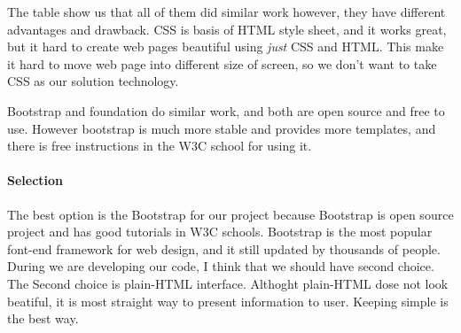 The table show us that all of them did similar work however, they have different advantages and drawback.
CSS is basis of HTML style sheet, and it works great, but it hard to create web pages beautiful using \textit{just} CSS and HTML.
This make it hard to move web page into different size of screen, so we don't want to take CSS as our solution technology.

Bootstrap and foundation do similar work, and both are open source and free to use.
However bootstrap is much more stable and provides more templates, and there is free instructions in the W3C school for using it.

\paragraph{Selection}

The best option is the Bootstrap for our project because Bootstrap is open source project and has good tutorials in W3C schools.
Bootstrap is the most popular font-end framework for web design, and it still updated by thousands of people.
During we are developing our code, I think that we should have second choice.
The Second choice is plain-HTML interface.
Althoght plain-HTML dose not look beatiful, it is most straight way to present information to user.
Keeping simple is the best way.
